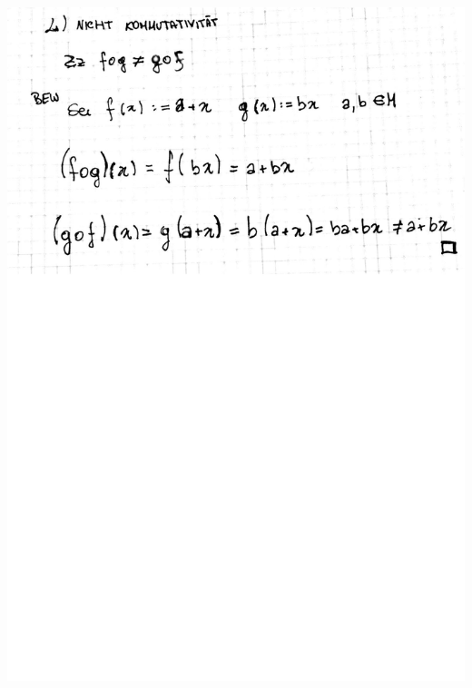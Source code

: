 \documentclass[10pt,a4paper]{article}
\begin{document}
\includegraphics[width=\textwidth]{lat5b_3.jpg}
\end{document}
